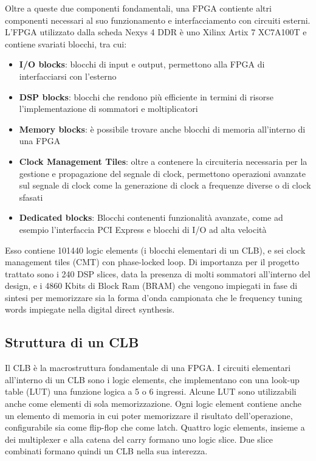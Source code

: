 Oltre a queste due componenti fondamentali, una FPGA contiente altri
componenti necessari al suo funzionamento e interfacciamento con
circuiti esterni.
L'FPGA utilizzato dalla scheda Nexys 4 DDR è uno Xilinx Artix 7 XC7A100T
e contiene svariati blocchi\cite{artix7overview}, tra cui:

\begin{itemize}
    \item \textbf{I/O blocks}: blocchi di input e output,
           permettono alla FPGA di interfacciarsi con l'esterno
    \item \textbf{DSP blocks}: blocchi che rendono più efficiente in termini
           di risorse l'implementazione di sommatori e moltiplicatori
    \item \textbf{Memory blocks}: è possibile trovare anche blocchi di
           memoria all'interno di una FPGA
    \item \textbf{Clock Management Tiles}: oltre a contenere la circuiteria
            necessaria per la gestione e propagazione del segnale di clock,
            permettono operazioni avanzate sul segnale di clock come la
            generazione di clock a frequenze diverse o di clock sfasati
    \item \textbf{Dedicated blocks}: Blocchi contenenti funzionalità avanzate,
            come ad esempio l'interfaccia PCI Express e blocchi di I/O ad alta
            velocità
\end{itemize}

Esso contiene 101440 logic elements (i blocchi elementari di un CLB), e sei
clock management tiles (CMT) con phase-locked loop.
Di importanza per il progetto trattato sono i 240 DSP slices, 
data la presenza di molti sommatori all'interno del design,
 e i 4860 Kbits di Block Ram (BRAM) che vengono impiegati in fase di 
sintesi per memorizzare sia la forma d'onda campionata che
le frequency tuning words impiegate nella digital direct synthesis.

\subsection{Struttura di un CLB}
Il CLB è la macrostruttura fondamentale di una FPGA.
I circuiti elementari all'interno di un CLB sono i logic elements, che implementano
con una look-up table (LUT) una funzione logica a 5 o 6 ingressi.
Alcune LUT sono utilizzabili anche come elementi di sola memorizzazione.
Ogni logic element contiene anche un elemento di memoria in cui poter memorizzare il risultato
dell'operazione, configurabile sia come flip-flop che come latch.
 Quattro logic elements, insieme a dei multiplexer e alla catena
del carry formano uno logic slice.
Due slice combinati formano quindi un CLB nella sua interezza.

